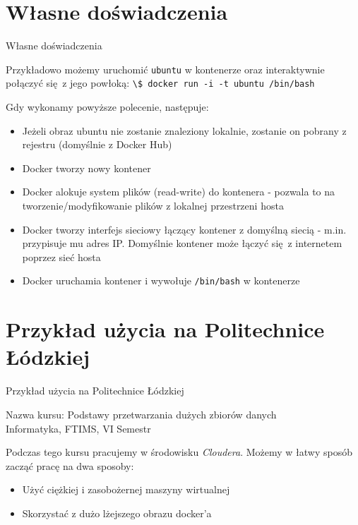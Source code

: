 \documentclass[aspectratio=169]{beamer}
\begin{document}
\section{Własne doświadczenia}
\begin{frame}{Własne doświadczenia}
    \begin{cardTiny}
        Przykładowo możemy uruchomić \colorbox{dark-gray}{\lstinline{ubuntu}} w kontenerze oraz interaktywnie połączyć się z jego powłoką: \colorbox{dark-gray}{\lstinline{\$ docker run -i -t ubuntu /bin/bash}}
    \end{cardTiny}

    \begin{cardTiny}
        Gdy wykonamy powyższe polecenie, następuje:
        \begin{itemize}
            \item Jeżeli obraz ubuntu nie zostanie znaleziony lokalnie, zostanie on pobrany z rejestru (domyślnie z Docker Hub)
            \item Docker tworzy nowy kontener
            \item Docker alokuje system plików (read-write) do kontenera - pozwala to na tworzenie/modyfikowanie plików z lokalnej przestrzeni hosta
            \item Docker tworzy interfejs sieciowy łączący kontener z domyślną siecią - m.in. przypisuje mu adres IP. Domyślnie kontener może łączyć się z internetem poprzez sieć hosta
            \item Docker uruchamia kontener i wywołuje \colorbox{dark-gray}{\lstinline{/bin/bash}} w kontenerze
        \end{itemize}
    \end{cardTiny}
\end{frame}

\section{Przykład użycia na Politechnice Łódzkiej}
\begin{frame}{Przykład użycia na Politechnice Łódzkiej}
    \begin{cardTiny}
        \centering
        Nazwa kursu: Podstawy przetwarzania dużych zbiorów danych\\
        Informatyka, FTIMS, VI Semestr
    \end{cardTiny}
    \begin{cardTiny}
        Podczas tego kursu pracujemy w środowisku \textit{Cloudera}. Możemy w łatwy sposób zacząć pracę na dwa sposoby:
        \begin{itemize}
            \item Użyć ciężkiej i zasobożernej maszyny wirtualnej
            \item Skorzystać z dużo lżejszego obrazu docker'a
        \end{itemize}
    \end{cardTiny}
\end{frame}
\end{document}
